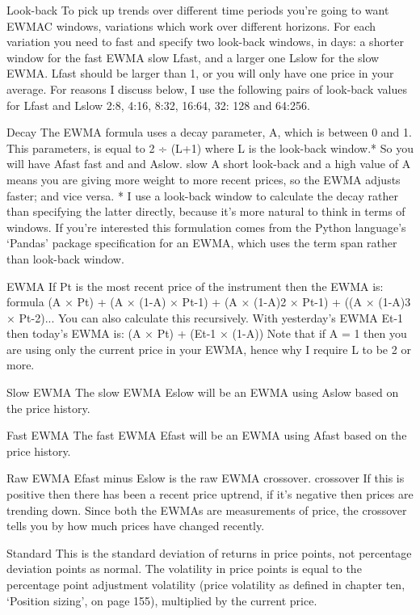 Look-back To pick up trends over different time periods you're going to want EWMAC windows, variations which work over different horizons. For each variation you need to fast and specify two look-back windows, in days: a shorter window for the fast EWMA slow Lfast, and a larger one Lslow for the slow EWMA. Lfast should be larger than 1, or you will only have one price in your average. For reasons I discuss below, I use the following pairs of look-back values for Lfast and Lslow 2:8, 4:16, 8:32, 16:64, 32: 128 and 64:256.

Decay The EWMA formula uses a decay parameter, A, which is between 0 and 1. This parameters, is equal to 2 ÷ (L+1) where L is the look-back window.* So you will have Afast fast and and Aslow. slow A short look-back and a high value of A means you are giving more weight to more recent prices, so the EWMA adjusts faster; and vice versa. * I use a look-back window to calculate the decay rather than specifying the latter directly, because it's more natural to think in terms of windows. If you're interested this formulation comes from the Python language's ‘Pandas' package specification for an EWMA, which uses the term span rather than look-back window.

EWMA If Pt is the most recent price of the instrument then the EWMA is: formula (A × Pt) + (A × (1-A) × Pt-1) + (A × (1-A)2 × Pt-1) + ((A × (1-A)3 × Pt-2)... You can also calculate this recursively. With yesterday's EWMA Et-1 then today's EWMA is: (A × Pt) + (Et-1 × (1-A)) Note that if A = 1 then you are using only the current price in your EWMA, hence why I require L to be 2 or more.

Slow EWMA The slow EWMA Eslow will be an EWMA using Aslow based on the price history.

Fast EWMA The fast EWMA Efast will be an EWMA using Afast based on the price history.

Raw EWMA Efast minus Eslow is the raw EWMA crossover. crossover If this is positive then there has been a recent price uptrend, if it's negative then prices are trending down. Since both the EWMAs are measurements of price, the crossover tells you by how much prices have changed recently.

Standard This is the standard deviation of returns in price points, not percentage deviation points as normal. The volatility in price points is equal to the percentage point adjustment volatility (price volatility as defined in chapter ten, ‘Position sizing', on page 155), multiplied by the current price.

